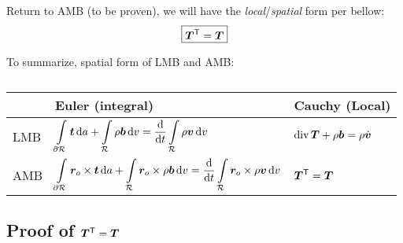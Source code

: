 Return to AMB (to be proven), we will have the \emph{local}/\emph{spatial} form per bellow:
%
\begin{equation}
  \boxed{\bm{T}^{\mathsf{T}} = \bm{T}}
  \label{eq:AMB_local_spatial}
\end{equation}

To summarize, spatial form of LMB and AMB:
%
\begin{table*}[h]
  \centering
  \begin{tabular}{@{}lll@{}}\toprule
         & Euler (integral) & Cauchy (Local) \\ \midrule
    LMB  & \(\displaystyle \int\limits_{\partial \mathcal{R}}\bm{t}\mathop{}\!\mathrm{d} a+\int\limits_\mathcal{R}\rho\bm{b}\mathop{}\!\mathrm{d} v=\frac{\mathop{}\!\mathrm{d} }{\mathop{}\!\mathrm{d} t}\int\limits_\mathcal{R}\rho\bm{v}\mathop{}\!\mathrm{d} v\)                                                         & \(\displaystyle \mathop{}\!\text{div}\, \bm{T} + \rho \bm{b} = \rho \dot{\bm{v}}\) \\[4ex]
    AMB  & \(\displaystyle \int\limits_{\partial \mathcal{R}}\bm{r}_o\mathbin{\times}\bm{t}\mathop{}\!\mathrm{d} a+\int\limits_\mathcal{R}\bm{r}_o\mathbin{\times}\rho\bm{b}\mathop{}\!\mathrm{d} v=\frac{\mathop{}\!\mathrm{d} }{\mathop{}\!\mathrm{d} t}\int\limits_\mathcal{R}\bm{r}_o\mathbin{\times}\rho\bm{v}\mathop{}\!\mathrm{d} v\) & \(\displaystyle \bm{T}^{\mathsf{T}} =  \bm{T}\)          \\
    \bottomrule
  \end{tabular}
  \caption{}
\end{table*}

%

\subsection{Proof of \texorpdfstring{\(\bm{T}^{\mathsf{T}} = \bm{T}\)}{TEXT}}


